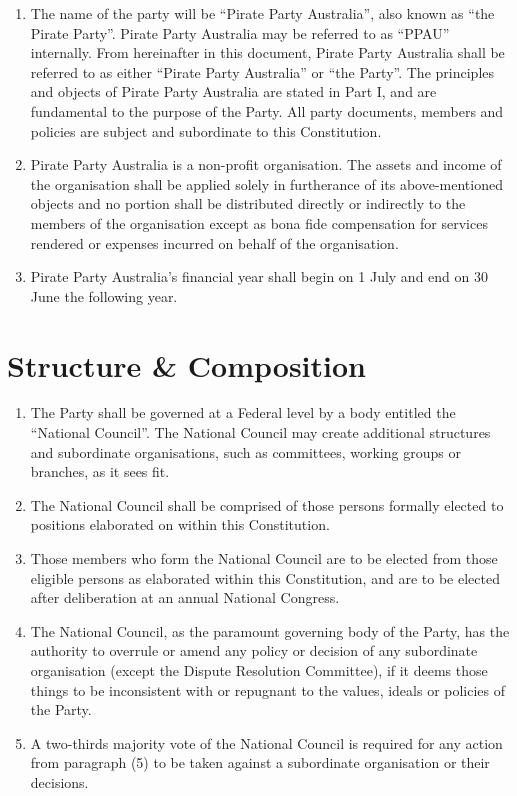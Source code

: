 \documentclass[a4paper,titlepage,8.5pt]{article}
\begin{document}
\begin{enumerate}
\item The name of the party will be ``Pirate Party Australia'', also known as ``the Pirate Party''. Pirate Party Australia may be referred to as ``PPAU'' internally. From hereinafter in this document, Pirate Party Australia shall be referred to as either ``Pirate Party Australia'' or ``the Party''. The principles and objects of Pirate Party Australia are stated in Part I, and are fundamental to the purpose of the Party. All party documents, members and policies are subject and subordinate to this Constitution.
\item Pirate Party Australia is a non-profit organisation. The assets and income of the organisation shall be applied solely in furtherance of its above-mentioned objects and no portion shall be distributed directly or indirectly to the members of the organisation except as bona fide compensation for services rendered or expenses incurred on behalf of the organisation.
\item Pirate Party Australia's financial year shall begin on 1 July and end on 30 June the following year.
\end{enumerate}

\section{Structure \& Composition}

\begin{enumerate}
\item The Party shall be governed at a Federal level by a body entitled the ``National Council''. The National Council may create additional structures and subordinate organisations, such as committees, working groups or branches, as it sees fit.
\item The National Council shall be comprised of those persons formally elected to positions elaborated on within this Constitution.
\item Those members who form the National Council are to be elected from those eligible persons as elaborated within this Constitution, and are to be elected after deliberation at an annual National Congress.
\item The National Council, as the paramount governing body of the Party, has the authority to overrule or amend any policy or decision of any subordinate organisation (except the Dispute Resolution Committee), if it deems those things to be inconsistent with or repugnant to the values, ideals or policies of the Party.
\item A two-thirds majority vote of the National Council is required for any action from paragraph (5) to be taken against a subordinate organisation or their decisions.
\end{enumerate}
\end{document}
